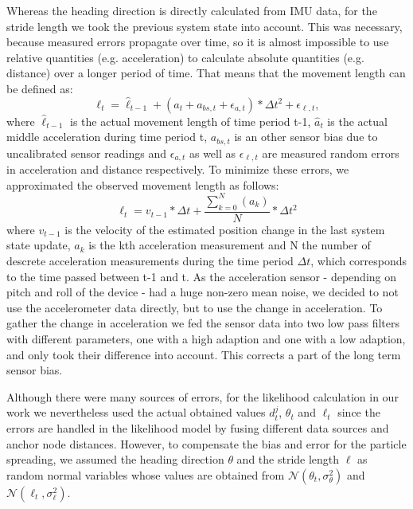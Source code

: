 Whereas the heading direction is directly calculated from IMU data, for the stride length we took the previous system state into account. This was necessary, because measured errors propagate over time, so it is almost impossible to use relative quantities (e.g. acceleration) to calculate absolute quantities (e.g. distance) over a longer period of time.
That means that the movement length can be defined as: 
$$\ell_{t} = \hat{\ell}_{t-1} + (\hat{a}_{t} + a_{bs,t} +\epsilon_{a, t}) * \Delta t^{2} + \epsilon_{\ell, t},$$
where $\hat{\ell}_{t-1}$ is the actual movement length of time period t-1, $\hat{a}_{t}$ is the actual middle acceleration during time period t, $a_{bs,t}$ is an other sensor bias due to uncalibrated sensor readings and $\epsilon_{a, t}$ as well as $\epsilon_{\ell, t}$ are measured random errors in acceleration and distance respectively.
To minimize these errors, we approximated the observed movement length as follows:
$$\ell_{t} = v_{t-1} * \Delta t + \frac{\sum_{k=0}^N (a_{k})}{N} * \Delta t^{2}$$
where $v_{t-1}$ is the velocity of the estimated position change in the last system state update, $a_{k}$ is the kth acceleration measurement and N the number of descrete acceleration measurements during the time period $\Delta t$, which corresponds to the time passed between t-1 and t. As the acceleration sensor - depending on pitch and roll of the device - had a huge non-zero mean noise, we decided to not use the accelerometer data directly, but to use the change in acceleration. To gather the change in acceleration we fed the sensor data into two low pass filters with different parameters, one with a high adaption and one with a low adaption, and only took their difference into account. This corrects a part of the long term sensor bias. 

Although there were many sources of errors, for the likelihood calculation in our work we nevertheless used the actual obtained values $d^{j}_{t}$, $\theta_{t}$ and $\ell_{t}$ since the errors are handled in the likelihood model by fusing different data sources and anchor node distances. However, to compensate the bias and error for the particle spreading, we assumed the heading direction $\theta$ and the stride length $\ell$ as random normal variables whose values are obtained from $\mathcal{N}(\theta_{t}, \sigma_{\theta}^{2})$ and $\mathcal{N}(\ell_{t}, \sigma_{\ell}^{2})$.

